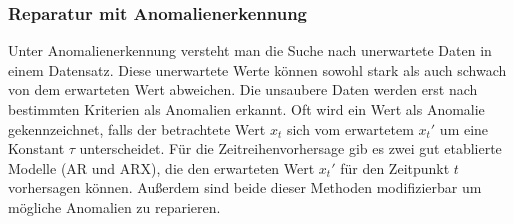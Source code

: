 \subsubsection{Reparatur mit Anomalienerkennung}\label{sec:anomalienerkennung}
Unter Anomalienerkennung versteht man die Suche nach unerwartete Daten in einem
Datensatz. Diese unerwartete Werte können sowohl stark als auch schwach von dem
erwarteten Wert abweichen. Die unsaubere Daten werden erst nach bestimmten
Kriterien als Anomalien erkannt. Oft wird ein Wert als Anomalie gekennzeichnet,
falls der betrachtete Wert $x_t$ sich vom erwartetem $x_t'$ um eine Konstant
$\tau$ unterscheidet. Für die Zeitreihenvorhersage gib es zwei gut etablierte
Modelle (AR und ARX), die den erwarteten Wert $x_t'$ für den Zeitpunkt $t$ vorhersagen
können. Außerdem sind beide dieser Methoden modifizierbar um mögliche Anomalien
zu reparieren.
